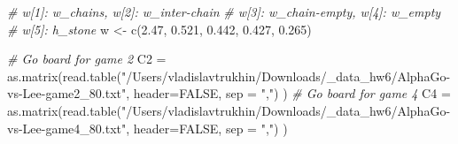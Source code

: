 \documentclass[
]{article}
\newenvironment{Shaded}{\begin{snugshade}}{\end{snugshade}}
\newcommand{\AttributeTok}[1]{\textcolor[rgb]{0.77,0.63,0.00}{#1}}
\newcommand{\CommentTok}[1]{\textcolor[rgb]{0.56,0.35,0.01}{\textit{#1}}}
\newcommand{\ConstantTok}[1]{\textcolor[rgb]{0.00,0.00,0.00}{#1}}
\newcommand{\FloatTok}[1]{\textcolor[rgb]{0.00,0.00,0.81}{#1}}
\newcommand{\FunctionTok}[1]{\textcolor[rgb]{0.00,0.00,0.00}{#1}}
\newcommand{\NormalTok}[1]{#1}
\newcommand{\OtherTok}[1]{\textcolor[rgb]{0.56,0.35,0.01}{#1}}
\newcommand{\StringTok}[1]{\textcolor[rgb]{0.31,0.60,0.02}{#1}}
\begin{document}
\begin{Shaded}
\begin{Highlighting}[]
\CommentTok{\# w[1]: w\_chains,   w[2]: w\_inter{-}chain}
\CommentTok{\# w[3]: w\_chain{-}empty,   w[4]: w\_empty}
\CommentTok{\# w[5]: h\_stone}
\NormalTok{w }\OtherTok{\textless{}{-}} \FunctionTok{c}\NormalTok{(}\FloatTok{2.47}\NormalTok{, }\FloatTok{0.521}\NormalTok{, }\FloatTok{0.442}\NormalTok{, }\FloatTok{0.427}\NormalTok{, }\FloatTok{0.265}\NormalTok{)}

\CommentTok{\# Go board for game 2}
\NormalTok{C2 }\OtherTok{=} \FunctionTok{as.matrix}\NormalTok{(}\FunctionTok{read.table}\NormalTok{(}\StringTok{"/Users/vladislavtrukhin/Downloads/\_data\_hw6/AlphaGo{-}vs{-}Lee{-}game2\_80.txt"}\NormalTok{, }\AttributeTok{header=}\ConstantTok{FALSE}\NormalTok{, }\AttributeTok{sep =} \StringTok{","}\NormalTok{) )}
\CommentTok{\# Go board for game 4}
\NormalTok{C4 }\OtherTok{=} \FunctionTok{as.matrix}\NormalTok{(}\FunctionTok{read.table}\NormalTok{(}\StringTok{"/Users/vladislavtrukhin/Downloads/\_data\_hw6/AlphaGo{-}vs{-}Lee{-}game4\_80.txt"}\NormalTok{, }\AttributeTok{header=}\ConstantTok{FALSE}\NormalTok{, }\AttributeTok{sep =} \StringTok{","}\NormalTok{) )}


\end{Highlighting}
\end{Shaded}
\end{document}
